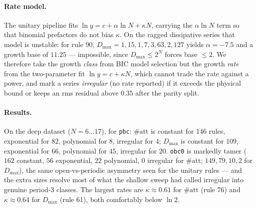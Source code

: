 \documentclass[11pt]{article}
\newcommand{\rt}[1]{\texttt{#1}}
\begin{document}
\paragraph{Rate model.} The unitary pipeline fits
$\ln y = c + \alpha\ln N + \kappa N$, carrying the $\alpha\ln N$ term so that
binomial prefactors do not bias $\kappa$. On the ragged dissipative series that
model is unstable: for rule 90, $D_{\max}=1,15,1,7,3,63,2,127$ yields
$\alpha=-7.5$ and a growth base of $11.25$ --- impossible, since $D_{\max}\le2^N$
forces base $\le2$. We therefore take the growth \emph{class} from BIC model
selection but the growth \emph{rate} from the two-parameter fit
$\ln y=c+\kappa N$, which cannot trade the rate against a power, and mark a
series \emph{irregular} (no rate reported) if it exceeds the physical bound or
keeps an rms residual above $0.35$ after the parity split.

\paragraph{Results.} On the deep dataset ($N=6\ldots17$), for \rt{pbc}:
$\#\mathrm{att}$ is constant for $146$ rules, exponential for $82$, polynomial for
$8$, irregular for $4$; $D_{\max}$ is constant for $109$, exponential for $66$,
polynomial for $45$, irregular for $20$. \rt{obc0} is markedly tamer ($162$
constant, $56$ exponential, $22$ polynomial, $0$ irregular for $\#\mathrm{att}$;
$149,79,10,2$ for $D_{\max}$), the same open-vs-periodic asymmetry seen for the
unitary rules --- and the extra sizes resolve most of what the shallow sweep had
called irregular into genuine period-$3$ classes. The largest rates are
$\kappa\approx0.61$ for $\#\mathrm{att}$ (rule 76) and $\kappa\approx0.64$ for
$D_{\max}$ (rule 61), both comfortably below $\ln2$.

\begin{table}[h]\centering\footnotesize\setlength{\tabcolsep}{4pt}%
\resizebox{\textwidth}{!}{}
\caption{Growth laws for representative dissipative rules (pbc, $N=6\ldots17$).
$^{\ast}$ marks a series whose even- and odd-$N$ subsequences obey different
laws. Where an exact integer recurrence exists, the base is the named algebraic
constant rather than a fitted slope.}
\label{tab:scaling}\end{table}
\end{document}
